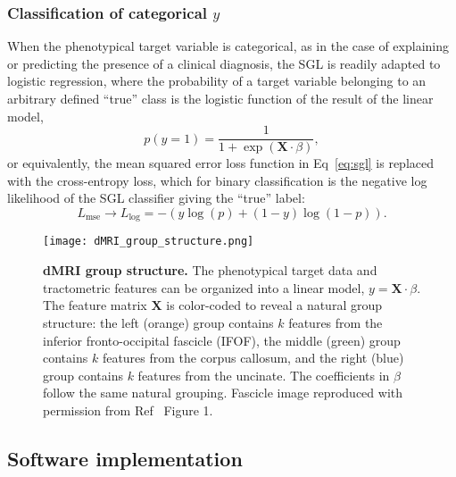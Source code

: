 \subsubsection*{Classification of categorical $y$}
When the phenotypical target variable is categorical, as in the case of
explaining or predicting the presence of a clinical diagnosis, the SGL is
readily adapted to logistic regression, where the probability of a target
variable belonging to an arbitrary defined ``true'' class is the logistic
function of the result of the linear model,
\begin{equation}
    p(y = 1) = \frac{1}{1 + \exp(\mathbf{X}\cdot \beta)},
    \label{eq:logit}
\end{equation}
or equivalently, the mean squared error loss function in Eq~\eqref{eq:sgl} is
replaced with the cross-entropy loss, which for binary classification is the
negative log likelihood of the SGL classifier giving the ``true'' label:
\begin{equation}
    L_{\text{mse}} \rightarrow L_{\log} =
    -\left(y \log(p) + (1 - y) \log(1 - p)\right).
    \label{eq:logloss}
\end{equation}

\begin{figure}[!h]
    \centering
    \texttt{[image: dMRI\_group\_structure.png]}
    \caption{{\bf dMRI group structure.}
        The phenotypical target data and tractometric features can be organized
    into a linear model, $y = \mathbf{X} \cdot \beta$. The feature matrix
    $\mathbf{X}$ is color-coded to reveal a natural group structure: the left
    (orange) group contains $k$ features from the inferior fronto-occipital
    fascicle (IFOF), the middle (green) group contains $k$ features from the
    corpus callosum, and the right (blue) group contains $k$ features from the
    uncinate. The coefficients in $\beta$ follow the same natural grouping.
    Fascicle image reproduced with permission from Ref~\cite{yeatman2012tract}
    Figure 1.}
    \label{fig:group-structure}
\end{figure}

\subsection*{Software implementation}

